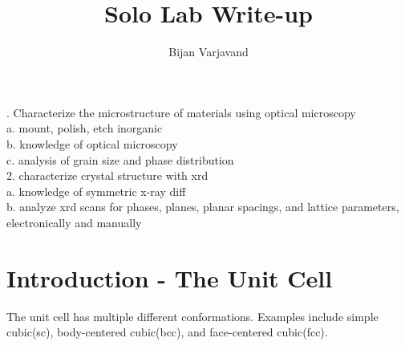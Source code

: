 \documentclass{article}
\author{Bijan Varjavand}
\title{Solo Lab Write-up}
\begin{document}
. Characterize the microstructure of materials using optical microscopy\\
a. mount, polish, etch inorganic\\
b. knowledge of optical microscopy\\
c. analysis of grain size and phase distribution\\

2. characterize crystal structure with xrd\\
a. knowledge of symmetric x-ray diff\\
b. analyze xrd scans for phases, planes, planar spacings, and lattice parameters, electronically and manually

\section{Introduction - The Unit Cell}

The unit cell has multiple different conformations. Examples include simple cubic(sc), body-centered cubic(bcc), and face-centered cubic(fcc).
\end{document}
